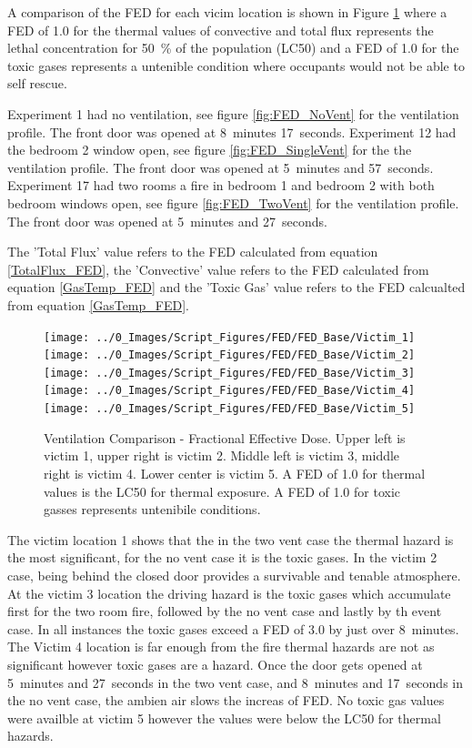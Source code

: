 \documentclass[12pt,oneside]{book}
\begin{document}
A comparison of the FED for each vicim location is shown in Figure \ref{fig:FED_Base} where a FED of 1.0 for the thermal values of convective and total flux represents the lethal concentration for 50~\% of the population (LC50) and  a FED of 1.0 for the toxic gases represents a untenible condition where occupants would not be able to self rescue. 

Experiment 1 had no ventilation, see figure \ref{fig:FED_NoVent} for the ventilation profile. The front door was opened at 8~minutes 17~seconds. Experiment 12 had the bedroom 2 window open, see figure \ref{fig:FED_SingleVent} for the the ventilation profile. The front door was opened at 5~minutes and 57~seconds. Experiment 17 had two rooms a fire in bedroom 1 and bedroom 2 with both bedroom windows open, see figure \ref{fig:FED_TwoVent} for the ventilation profile. The front door was opened at 5~minutes and 27~seconds. 

The 'Total Flux' value refers to the FED calculated from equation \ref{TotalFlux_FED}, the 'Convective' value refers to the FED calculated from equation \ref{GasTemp_FED} and the 'Toxic Gas' value refers to the FED calcualted from equation \ref{GasTemp_FED}.

\begin{figure}[H]
	\centering
	\texttt{[image: ../0\_Images/Script\_Figures/FED/FED\_Base/Victim\_1]}
	\texttt{[image: ../0\_Images/Script\_Figures/FED/FED\_Base/Victim\_2]}
	\texttt{[image: ../0\_Images/Script\_Figures/FED/FED\_Base/Victim\_3]}
	\texttt{[image: ../0\_Images/Script\_Figures/FED/FED\_Base/Victim\_4]}
	\texttt{[image: ../0\_Images/Script\_Figures/FED/FED\_Base/Victim\_5]}
	\caption[Ventilation Comparison - FED]{Ventilation Comparison - Fractional Effective Dose. Upper left is victim 1, upper right is victim 2. Middle left is victim 3, middle right is victim 4. Lower center is victim 5. A FED of 1.0 for thermal values is the LC50 for thermal exposure. A FED of 1.0 for toxic gasses represents untenibile conditions.}
	\label{fig:FED_Base}
\end{figure}

The victim location 1 shows that the in the two vent case the thermal hazard is the most significant, for the no vent case it is the toxic gases. In the victim 2 case, being behind the closed door provides a survivable and tenable atmosphere. At the victim 3 location the driving hazard is the toxic gases which accumulate first for the two room fire, followed by the no vent case and lastly by th event case. In all instances the toxic gases exceed a FED of 3.0 by just over 8~minutes. The Victim 4 location is far enough from the fire thermal hazards are not as significant however toxic gases are a hazard. Once the door gets opened at 5~minutes and 27~seconds in the two vent case, and 8~minutes and 17~seconds in the no vent case, the ambien air slows the increas of FED. No toxic gas values were availble at victim 5 however the values were below the LC50 for thermal hazards. 
\end{document}
